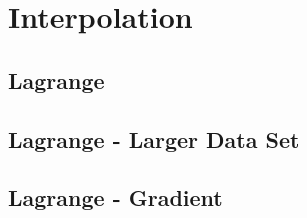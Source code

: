 \chapter{Interpolation}


\section{Lagrange}





\section{Lagrange - Larger Data Set}




\section{Lagrange - Gradient}




